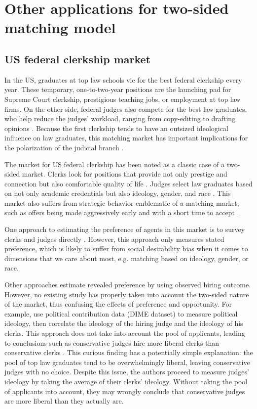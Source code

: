 \section{Other applications for two-sided matching model}

\subsection{US federal clerkship market}

In the US, graduates at top law schools vie for the best federal clerkship every
year. These temporary, one-to-two-year positions are the launching pad for
Supreme Court clerkship, prestigious teaching jobs, or employment at top law
firms. On the other side, federal judges also compete for the best law
graduates, who help reduce the judges' workload, ranging from copy-editing to
drafting opinions \citep{Gulati2016, Posner2001}. Because the first clerkship
tends to have an outsized ideological influence on law graduates, this matching
market has important implications for the polarization of the judicial branch
\citep{Ditslear2001, Liptak2007}.

The market for US federal clerkship has been noted as a classic case of a
two-sided market. Clerks look for positions that provide not only prestige and
connection but also comfortable quality of life \citep{Posner2001}. Judges
select law graduates based on not only academic credentials but also ideology,
gender, and race \citep{Slotnick1984}. This market also suffers from strategic
behavior emblematic of a matching market, such as offers being made aggressively
early and with a short time to accept \citep{Posner2001, Posner2007}.

One approach to estimating the preference of agents in this market is to survey
clerks and judges directly \citep{Peppers2008}. However, this approach only
measures stated preference, which is likely to suffer from social desirability
bias when it comes to dimensions that we care about most, e.g. matching based
on ideology, gender, or race.

Other approaches estimate revealed preference by using observed hiring outcome.
However, no existing study has properly taken into account the two-sided nature
of the market, thus confusing the effects of preference and opportunity. For
example, \citet{Bonica2017} use political contribution data (DIME dataset) to
measure political ideology, then correlate the ideology of the hiring judge and
the ideology of his clerks. This approach does not take into account the pool of
applicants, leading to conclusions such as conservative judges hire more liberal
clerks than conservative clerks \citep[31]{Bonica2017}. This curious finding has
a potentially simple explanation: the pool of top law graduates tend to be
overwhelmingly liberal, leaving conservative judges with no choice. Despite
this issue, the authors proceed to measure judges' ideology by taking the
average of their clerks' ideology. Without taking the pool of applicants into
account, they may wrongly conclude that conservative judges are more liberal
than they actually are.

